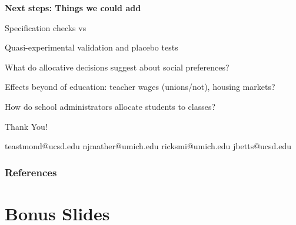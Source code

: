 \documentclass[t,aspectratio=169,11pt,presentation]{beamer}
\newenvironment{wideitemize}{\itemize\addtolength{\itemsep}{14pt}}{\enditemize}
\begin{document}
\begin{frame}{\textbf{Next steps: Things we could add}}
\begin{wideitemize}

    \item Specification checks vs \citep{chetty2014measuring1,Delgado2020,pope2017multidimensional}
    \item Quasi-experimental validation and placebo tests
    \item What do allocative decisions suggest about social preferences?
    \item Effects beyond of education: teacher wages (unions/not), housing markets?
    \item How do school administrators allocate students to classes?
    

\end{wideitemize}
   

\end{frame}




\begin{frame}[c,noframenumbering]
\centering
\Huge{\centerline{Thank You!}}

\normalsize  teastmond@ucsd.edu \hspace{1em} njmather@umich.edu \hspace{1em} ricksmi@umich.edu \hspace{1em} jbetts@ucsd.edu

\end{frame}



\begin{frame}
\frametitle{References}
\tiny

\end{frame}



\appendix
{}


\section{Bonus Slides}
\end{document}
